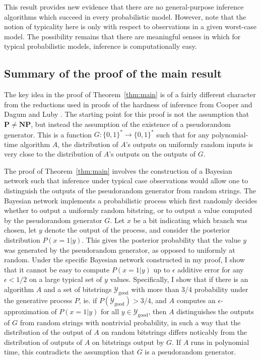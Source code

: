 \documentclass{article}
\renewcommand{\P}{\mathbf{P}}
\newcommand{\NP}{\mathbf{NP}}
\def \Ygood{\mathcal{Y}_\text{good}}
\theoremstyle{definition}
\theoremstyle{remark}
\begin{document}
This result provides new evidence that there are no general-purpose inference algorithms which succeed in every probabilistic model.
However, note that the notion of typicality here is only with respect to observations in a given worst-case model.
The possibility remains that there are meaningful senses in which for typical probabilistic models, inference is computationally easy.

\subsection{Summary of the proof of the main result}
The key idea in the proof of Theorem~\ref{thm:main} is of a fairly different character from the reductions used in proofs of the hardness of inference from Cooper \cite{cooper1990} and Dagum and Luby \cite{dagum1993}.
The starting point for this proof is not the assumption that $\P \neq \NP$, but instead the assumption of the existence of a pseudorandom generator.
This is a function $G: \{0, 1\}^* \to \{0, 1\}^*$ such that for any polynomial-time algorithm $A$, the distribution of $A$'s outputs on uniformly random inputs is very close to the distribution of $A$'s outputs on the outputs of $G$.

The proof of Theorem~\ref{thm:main} involves the construction of a Bayesian network such that inference under typical case observations would allow one to distinguish the outputs of the pseudorandom generator from random strings.
The Bayesian network implements a probabilistic process which first randomly decides whether to output a uniformly random bitstring, or to output a value computed by the pseudorandom generator $G$.
Let $x$ be a bit indicating which branch was chosen,
let $y$ denote the output of the process,
and consider the posterior distribution $P(x = 1 | y)$.
This gives the posterior probability that the value $y$ was generated by the pseudorandom generator, as opposed to uniformly at random.
Under the specific Bayesian network constructed in my proof, I show that it cannot be easy to compute $P(x = 1 | y)$ up to $\epsilon$ additive error for any $\epsilon < 1/2$ on a large typical set of $y$ values.
Specifically, I show that if there is an algorithm $A$ and a set of bitstrings
$\Ygood$ with more than 3/4 probability under the generative process $P$,
ie. if 
$P(\Ygood) > 3/4$,
and $A$ computes an $\epsilon$-approximation of $P(x = 1 | y)$
for all $y \in \Ygood$,
then $A$ distinguishes the outputs of $G$ from random strings with nontrivial probability, in such a way that the distribution of the output of $A$ on random bitstrings differs noticably from the distribution of outputs of $A$ on bitstrings output by $G$.
If $A$ runs in polynomial time, this contradicts the assumption that $G$ is a pseudorandom generator.
\end{document}
